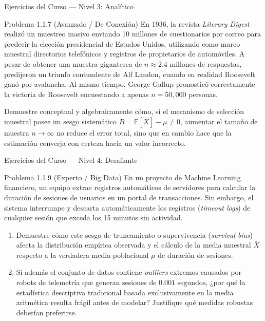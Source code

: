\begin{frame}{Ejercicios del Curso — Nivel 3: Analítico}
  \vspace{-0.3em}
  \footnotesize
  \begin{block}{Problema 1.1.7 (Avanzado / De Conexión)}
    En 1936, la revista \emph{Literary Digest} realizó un muestreo masivo enviando 10 millones de cuestionarios por correo para predecir la elección presidencial de Estados Unidos, utilizando como marco muestral directorios telefónicos y registros de propietarios de automóviles. A pesar de obtener una muestra gigantesca de $n \approx 2.4 \text{ millones}$ de respuestas, predijeron un triunfo contundente de Alf Landon, cuando en realidad Roosevelt ganó por avalancha. Al mismo tiempo, George Gallup pronosticó correctamente la victoria de Roosevelt encuestando a apenas $n = 50,000$ personas.
    
    Demuestre conceptual y algebraicamente cómo, si el mecanismo de selección muestral posee un sesgo sistemático $B = \mathbb{E}[\bar{X}] - \mu \neq 0$, aumentar el tamaño de muestra $n \to \infty$ no reduce el error total, sino que en cambio hace que la estimación converja con certeza hacia un valor incorrecto.
  \end{block}
\end{frame}

\begin{frame}{Ejercicios del Curso — Nivel 4: Desafiante}
  \vspace{-0.2em}
  \small
  \begin{block}{Problema 1.1.9 (Experto / Big Data)}
    En un proyecto de Machine Learning financiero, un equipo extrae registros automáticos de servidores para calcular la duración de sesiones de usuarios en un portal de transacciones. Sin embargo, el sistema interrumpe y descarta automáticamente los registros (\emph{timeout logs}) de cualquier sesión que exceda los 15 minutos sin actividad.
    \begin{enumerate}
      \item Demuestre cómo este sesgo de truncamiento o supervivencia (\emph{survival bias}) afecta la distribución empírica observada y el cálculo de la media muestral $\bar{X}$ respecto a la verdadera media poblacional $\mu$ de duración de sesiones.
      \item Si además el conjunto de datos contiene \emph{outliers} extremos causados por robots de telemetría que generan sesiones de $0.001 \text{ segundos}$, ¿por qué la estadística descriptiva tradicional basada exclusivamente en la media aritmética resulta frágil antes de modelar? Justifique qué medidas robustas deberían preferirse.
    \end{enumerate}
  \end{block}
\end{frame}

